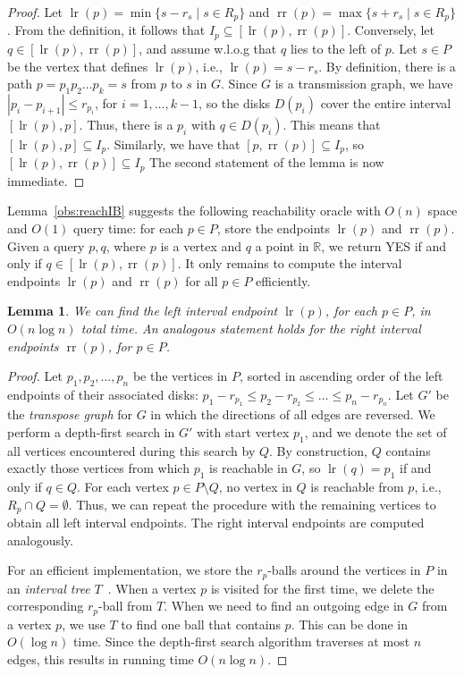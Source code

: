\documentclass[11pt,a4paper]{paper}
\newtheorem{lemma}[theorem]{Lemma}
\newcommand{\mathset}[1]{\ensuremath {\mathbb {#1}}}
\newcommand{\R}{\mathset{R}}
\DeclareMathOperator{\lr}{lr}
\DeclareMathOperator{\rr}{rr}
\begin{document}
\begin{proof}
Let $\lr(p) = \min \{ s - r_s \mid s \in R_p\}$ and
$\rr(p) = \max \{ s + r_s \mid s \in R_p\}$.
From the definition, it follows that $I_p \subseteq [\lr(p), \rr(p)]$.
Conversely, let $q \in [\lr(p),\rr(p)]$, and assume
w.l.o.g that $q$ lies to the left of $p$. Let $s \in P$ be the
vertex that defines $\lr(p)$, i.e.,
$\lr(p) = s - r_{s}$.
By definition, there is a path $p = p_1 p_2 \dots p_k =  s$
from $p$ to $s$ in $G$.
Since $G$ is a transmission graph, we have $|p_i - p_{i+1}| \leq r_{p_i}$,
for $i = 1, \dots, k-1$, so the disks
$D(p_i)$ cover the entire interval $[\lr(p),p]$. Thus, there is a $p_i$
with $q \in D(p_i)$. This means that $[\lr(p), p] \subseteq I_p$.
Similarly, we have that $[p, \rr(p)] \subseteq I_p$,
so $[\lr(p), \rr(p)] \subseteq I_p$
The second statement of the lemma is now immediate.
\end{proof}

Lemma~\ref{obs:reachIB} suggests the following reachability
oracle with $O(n)$ space
and $O(1)$ query time:
for each $p \in P$, store
the endpoints $\lr(p)$ and $\rr(p)$. 
Given a query $p,q$, where $p$ is a vertex and $q$ a point in $\R$,
we return YES if and only if $q \in [\lr(p),\rr(p)]$.
It only remains to compute the interval endpoints 
$\lr(p)$ and $\rr(p)$ for all $p \in P$ efficiently.

\begin{lemma}
\label{lem:findlr}
We can find the left interval endpoint $\lr(p)$, 
for each $p \in P$, in $O(n\log n)$ total time.
An analogous statement holds for the right interval 
endpoints $\rr(p)$, for $p \in P$.
\end{lemma}

\begin{proof}
Let $p_1, p_2, \dots, p_n$ be the vertices in $P$,
sorted in ascending order of the left endpoints of
their associated disks: $p_1 - r_{p_1} \leq p_2 - r_{p_2} \leq \dots 
\leq p_n - r_{p_n}$.
Let $G'$ be the \emph{transpose graph} for $G$ in which the 
directions of all edges are reversed. We perform a
depth-first search in $G'$ with start vertex $p_1$, and 
we denote the set of all vertices
encountered during this search by $Q$. 
By construction, $Q$ contains exactly those vertices from which
$p_1$ is reachable in $G$, so
$\lr(q) = p_1$ if and only if $q \in Q$.
For each vertex $p \in P \setminus Q$, 
no vertex in $Q$ is reachable from $p$, i.e., 
$R_p \cap Q = \emptyset$.
Thus, we can repeat the procedure with the remaining
vertices to obtain all left interval endpoints.
The right interval endpoints are computed analogously.

For an efficient implementation, we store 
the $r_p$-balls around the vertices in $P$ in an 
\emph{interval tree} $T$~\cite{4M}. When a vertex $p$ is visited
for the first time, we delete the corresponding $r_p$-ball from
$T$. When we need to find an outgoing edge in $G$ from
a vertex $p$, we 
use $T$ to find one ball that contains $p$. This
can be done in $O(\log n)$ time. Since the depth-first search
algorithm traverses at most $n$ edges, this results in running
time $O(n \log n)$.
\end{proof}
\end{document}
